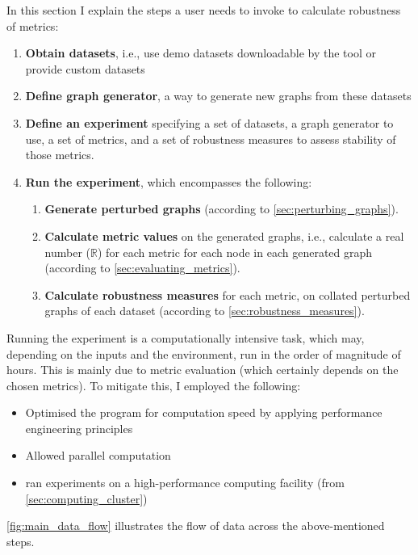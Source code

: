 In this section I explain the steps a user needs to invoke to calculate robustness of metrics:
\begin{enumerate}[topsep=5pt,itemsep=0pt]
    \item \textbf{Obtain datasets}, i.e., use demo datasets downloadable by the \graffs tool or provide custom datasets
    \item \textbf{Define graph generator}, a way to generate new graphs from these datasets
    \item \textbf{Define an experiment} specifying a set of datasets, a graph generator to use, a set of metrics, and a set of robustness measures to assess stability of those metrics.
    \item \textbf{Run the experiment}, which encompasses the following:
    \begin{enumerate}[label=\alph*.]
        \item \textbf{Generate perturbed graphs} (according to \autoref{sec:perturbing_graphs}).
        \item \textbf{Calculate metric values} on the generated graphs, i.e., calculate a real number ($\mathbb{R}$) for each metric for each node in each generated graph (according to \autoref{sec:evaluating_metrics}).
        \item \textbf{Calculate robustness measures} for each metric, on collated perturbed graphs of each dataset (according to \autoref{sec:robustness_measures}).
    \end{enumerate}
\end{enumerate}



Running the experiment is a computationally intensive task, which may, depending on the inputs and the environment, run in the order of magnitude of hours.
This is mainly due to metric evaluation (which certainly depends on the chosen metrics).
To mitigate this, I employed the following:
\begin{itemize}[topsep=5pt,itemsep=-2pt]
    \item Optimised the program for computation speed by applying performance engineering principles
    \item Allowed parallel computation
    \item ran experiments on a high-performance computing facility (from \autoref{sec:computing_cluster})
\end{itemize}

\autoref{fig:main_data_flow} illustrates the flow of data across the above-mentioned steps.

